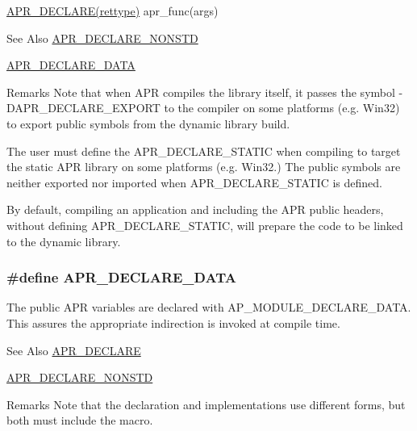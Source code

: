 \begin{DoxyPre}
\hyperlink{group__apr__platform_gad7b91b811a172bfa802603c2fb688f98}{APR\_DECLARE(rettype)} apr\_func(args)
\end{DoxyPre}
 \begin{DoxySeeAlso}{See Also}
\hyperlink{group__apr__platform_ga3ad5e45fabbda0ec5f106c334f1a0ae5}{A\-P\-R\-\_\-\-D\-E\-C\-L\-A\-R\-E\-\_\-\-N\-O\-N\-S\-T\-D} 

\hyperlink{group__apr__platform_ga16a1a3d65c57ce052fffb63190b1cadc}{A\-P\-R\-\_\-\-D\-E\-C\-L\-A\-R\-E\-\_\-\-D\-A\-T\-A} 
\end{DoxySeeAlso}
\begin{DoxyRemark}{Remarks}
Note that when A\-P\-R compiles the library itself, it passes the symbol -\/\-D\-A\-P\-R\-\_\-\-D\-E\-C\-L\-A\-R\-E\-\_\-\-E\-X\-P\-O\-R\-T to the compiler on some platforms (e.\-g. Win32) to export public symbols from the dynamic library build.\par
The user must define the A\-P\-R\-\_\-\-D\-E\-C\-L\-A\-R\-E\-\_\-\-S\-T\-A\-T\-I\-C when compiling to target the static A\-P\-R library on some platforms (e.\-g. Win32.) The public symbols are neither exported nor imported when A\-P\-R\-\_\-\-D\-E\-C\-L\-A\-R\-E\-\_\-\-S\-T\-A\-T\-I\-C is defined.\par
By default, compiling an application and including the A\-P\-R public headers, without defining A\-P\-R\-\_\-\-D\-E\-C\-L\-A\-R\-E\-\_\-\-S\-T\-A\-T\-I\-C, will prepare the code to be linked to the dynamic library. 
\end{DoxyRemark}
\hypertarget{group__apr__platform_ga16a1a3d65c57ce052fffb63190b1cadc}{
\subsubsection[{A\-P\-R\-\_\-\-D\-E\-C\-L\-A\-R\-E\-\_\-\-D\-A\-T\-A}]{\setlength{\rightskip}{0pt plus 5cm}\#define A\-P\-R\-\_\-\-D\-E\-C\-L\-A\-R\-E\-\_\-\-D\-A\-T\-A}}\label{group__apr__platform_ga16a1a3d65c57ce052fffb63190b1cadc}
The public A\-P\-R variables are declared with A\-P\-\_\-\-M\-O\-D\-U\-L\-E\-\_\-\-D\-E\-C\-L\-A\-R\-E\-\_\-\-D\-A\-T\-A. This assures the appropriate indirection is invoked at compile time. \begin{DoxySeeAlso}{See Also}
\hyperlink{group__apr__platform_gad7b91b811a172bfa802603c2fb688f98}{A\-P\-R\-\_\-\-D\-E\-C\-L\-A\-R\-E} 

\hyperlink{group__apr__platform_ga3ad5e45fabbda0ec5f106c334f1a0ae5}{A\-P\-R\-\_\-\-D\-E\-C\-L\-A\-R\-E\-\_\-\-N\-O\-N\-S\-T\-D} 
\end{DoxySeeAlso}
\begin{DoxyRemark}{Remarks}
Note that the declaration and implementations use different forms, but both must include the macro.
\end{DoxyRemark}

